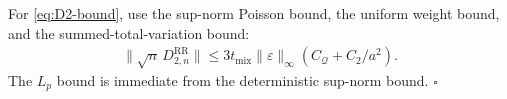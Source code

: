 For \eqref{eq:D2-bound}, use the sup-norm Poisson bound, the uniform weight bound, and
the summed-total-variation bound:
\begin{equation}
\begin{aligned}
\lVert  \sqrt{n} \, D_{2, n}^{\text{RR}}  \rVert
  \le 3 t_{\text{mix}} \lVert  \varepsilon  \rVert_\infty (C_{\mathcal{Q}} + C_2 / a^2).
\end{aligned}
\end{equation}
The \(L_p\) bound is immediate from the deterministic sup-norm bound. \(\square\)
